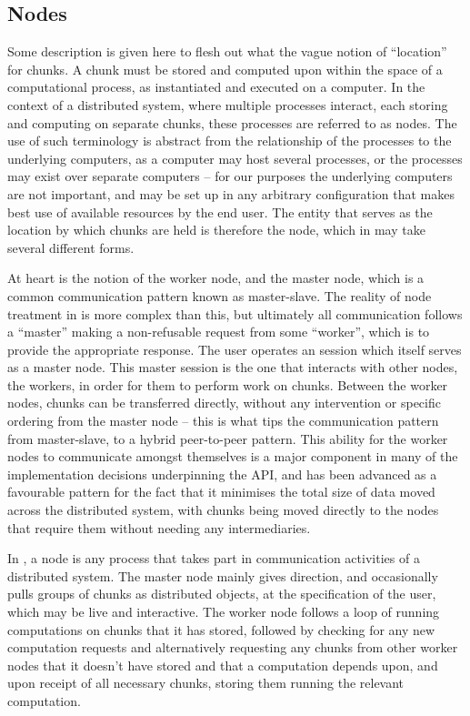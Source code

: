 \subsection{Nodes}\label{sec:node}

Some description is given here to flesh out what the vague notion of ``location'' for chunks.
A chunk must be stored and computed upon within the space of a computational process, as instantiated and executed on a computer.
In the context of a distributed system, where multiple processes interact, each storing and computing on separate chunks, these processes are referred to as nodes.
The use of such terminology is abstract from the relationship of the processes to the underlying computers, as a computer may host several processes, or the processes may exist over separate computers -- for our purposes the underlying computers are not important, and may be set up in any arbitrary configuration  that makes best use of available resources by the end user.
The entity that serves as the location by which chunks are held is therefore the node, which in \lsr{} may take several different forms.

At heart is the notion of the worker node, and the master node, which is a common communication pattern known as master-slave\cite{rfc2136}.
The reality of node treatment in \lsr{} is more complex than this, but ultimately all communication follows a ``master'' making a non-refusable request from some ``worker'', which is to provide the appropriate response.
The user operates an \R{} session which itself serves as a master node.
This master session is the one that interacts with other nodes, the workers, in order for them to perform work on chunks.
Between the worker nodes, chunks can be transferred directly, without any intervention or specific ordering from the master node -- this is what tips the communication pattern from master-slave, to a hybrid peer-to-peer pattern.
This ability for the worker nodes to communicate amongst themselves is a major component in many of the implementation decisions underpinning the API, and has been advanced as a favourable pattern for the fact that it minimises the total size of data moved across the distributed system, with chunks being moved directly to the nodes that require them without needing any intermediaries.

In \lsr{}, a node is any process that takes part in communication activities of a distributed system.
The master node mainly gives direction, and occasionally pulls groups of chunks as distributed objects, at the specification of the user, which may be live and interactive.
The worker node follows a loop of running computations on chunks that it has stored, followed by checking for any new computation requests and alternatively requesting any chunks from other worker nodes that it doesn't have stored and that a computation depends upon, and upon receipt of all necessary chunks, storing them running the relevant computation.


